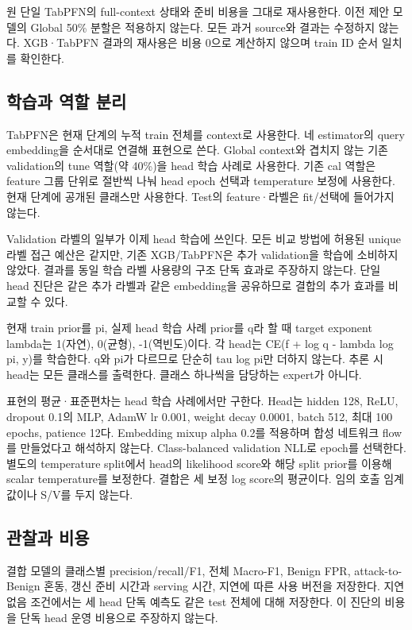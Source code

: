 원 단일 TabPFN의 full-context 상태와 준비 비용을 그대로 재사용한다. 이전 제안 모델의 Global 50\% 분할은 적용하지 않는다. 모든 과거 source와 결과는 수정하지 않는다. XGB·TabPFN 결과의 재사용은 비용 0으로 계산하지 않으며 train ID 순서 일치를 확인한다.

\subsection{학습과 역할 분리}
TabPFN은 현재 단계의 누적 train 전체를 context로 사용한다. 네 estimator의 query embedding을 순서대로 연결해 표현으로 쓴다. Global context와 겹치지 않는 기존 validation의 tune 역할(약 40\%)을 head 학습 사례로 사용한다. 기존 cal 역할은 feature 그룹 단위로 절반씩 나눠 head epoch 선택과 temperature 보정에 사용한다. 현재 단계에 공개된 클래스만 사용한다. Test의 feature·라벨은 fit/\allowbreak{}선택에 들어가지 않는다.

Validation 라벨의 일부가 이제 head 학습에 쓰인다. 모든 비교 방법에 허용된 unique 라벨 접근 예산은 같지만, 기존 XGB/\allowbreak{}TabPFN은 추가 validation을 학습에 소비하지 않았다. 결과를 동일 학습 라벨 사용량의 구조 단독 효과로 주장하지 않는다. 단일 head 진단은 같은 추가 라벨과 같은 embedding을 공유하므로 결합의 추가 효과를 비교할 수 있다.

현재 train prior를 pi, 실제 head 학습 사례 prior를 q라 할 때 target exponent lambda는 1(자연), 0(균형), -1(역빈도)이다. 각 head는 CE(f +\allowbreak{} log q - lambda log pi, y)를 학습한다. q와 pi가 다르므로 단순히 tau log pi만 더하지 않는다. 추론 시 head는 모든 클래스를 출력한다. 클래스 하나씩을 담당하는 expert가 아니다.

표현의 평균·표준편차는 head 학습 사례에서만 구한다. Head는 hidden 128, ReLU, dropout 0.1의 MLP, AdamW lr 0.001, weight decay 0.0001, batch 512, 최대 100 epochs, patience 12다. Embedding mixup alpha 0.2를 적용하며 합성 네트워크 flow를 만들었다고 해석하지 않는다. Class-balanced validation NLL로 epoch를 선택한다. 별도의 temperature split에서 head의 likelihood score와 해당 split prior를 이용해 scalar temperature를 보정한다. 결합은 세 보정 log score의 평균이다. 임의 호출 임계값이나 S/\allowbreak{}V를 두지 않는다.

\subsection{관찰과 비용}
결합 모델의 클래스별 precision/\allowbreak{}recall/\allowbreak{}F1, 전체 Macro-F1, Benign FPR, attack-to-Benign 혼동, 갱신 준비 시간과 serving 시간, 지연에 따른 사용 버전을 저장한다. 지연 없음 조건에서는 세 head 단독 예측도 같은 test 전체에 대해 저장한다. 이 진단의 비용을 단독 head 운영 비용으로 주장하지 않는다.

